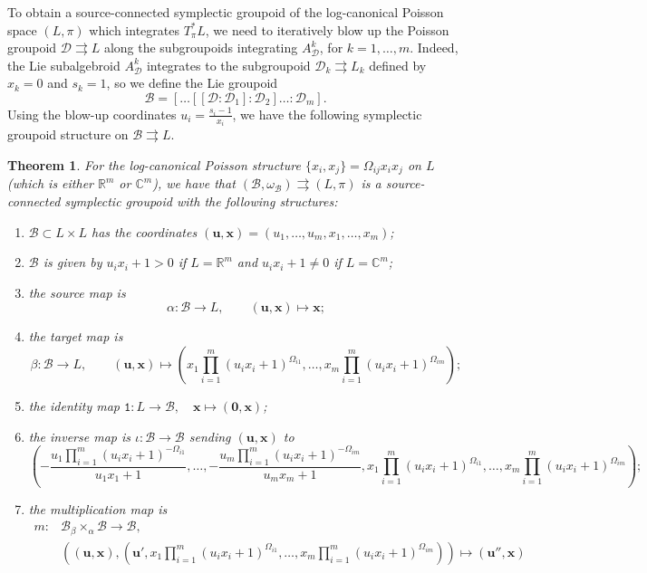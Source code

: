 \documentclass{amsart}
\newtheorem{theorem}{Theorem}[section]
\numberwithin{equation}{section}
\newcommand{\bfu}{{\boldsymbol{u}}}
\newcommand{\bfx}{{\boldsymbol{x}}}
\newcommand{\bfzero}{\mathbf{0}}
\newcommand{\cB}{\mathcal{B}}
\newcommand{\cD}{\mathcal{D}}
\newcommand{\CC}{\mathbb{C}}
\newcommand{\RR}{\mathbb{R}}
\newcommand{\rra}{\rightrightarrows}
\begin{document}
To obtain a source-connected symplectic groupoid of the log-canonical Poisson space $(L, \pi)$ which integrates $T^*_\pi L$, we need to iteratively blow up the Poisson groupoid $\cD \rra L$ along the subgroupoids integrating $A_\cD^k$, for $k =1, \ldots, m$.
Indeed, the Lie subalgebroid $A_\cD^k$ integrates to the subgroupoid $\cD_k \rra L_k$ defined by $x_k=0$ and $s_k=1$, so we define the Lie groupoid
\[\cB = [\ldots[[\cD\!:\!\cD_1]\!:\!\cD_2] \ldots \!:\!\cD_m].\]
Using the blow-up coordinates $u_i = \frac{s_i-1}{x_i}$, we have the following symplectic groupoid structure on $\cB \rra L$.
\begin{theorem} 
  \label{th:blowup groupoid}
  For the log-canonical Poisson structure $\{x_i, x_j\} = \Omega_{ij} x_i x_j$ on $L$ (which is either $\RR^m$ or $\CC^m$), we have that $(\cB, \omega_\cB) \rra (L, \pi)$ is a source-connected symplectic groupoid with the following structures:
  \begin{enumerate}
    \item $\cB \subset L \times L$ has the coordinates $(\bfu, \bfx) = (u_1, \ldots, u_m, x_1, \ldots, x_m)$;
    \item $\cB$ is given by $u_i x_i + 1 > 0$ if $L = \RR^m$ and $u_i x_i + 1\ne 0$ if $L = \CC^m$;
    \item the source map is
      \[\alpha: \cB \to L, \qquad (\bfu, \bfx) \mapsto \bfx;\]
    \item the target map is
      \[\beta: \cB \to L, \qquad (\bfu, \bfx) \mapsto \left(x_1 \prod_{i=1}^m (u_ix_i+1)^{\Omega_{i1}}, \ldots, x_m \prod_{i=1}^m (u_ix_i+1)^{\Omega_{im}}\right);\]
	\item the identity map $\mathtt{1}: L \to \cB, \quad \bfx \mapsto (\bfzero, \bfx)$;
    \item the inverse map is $\iota: \cB \to \cB$ sending $(\bfu, \bfx)$ to 
      \[\left(-\frac{u_1\prod_{i=1}^m (u_ix_i+1)^{-\Omega_{i1}}}{u_1x_1+1}, \ldots, -\frac{u_m\prod_{i=1}^m (u_ix_i+1)^{-\Omega_{im}}}{u_mx_m+1}, x_1 \prod_{i=1}^m (u_ix_i+1)^{\Omega_{i1}}, \ldots, x_m \prod_{i=1}^m (u_ix_i+1)^{\Omega_{im}}\right);\]
    \item the multiplication map is
      \[\begin{aligned}
	  m: & \cB {_\beta \times_\alpha} \cB \to \cB, \\
	     & \left((\bfu, \bfx), \left(\bfu', x_1 \prod_{i=1}^m (u_ix_i+1)^{\Omega_{i1}}, \ldots, x_m \prod_{i=1}^m (u_ix_i+1)^{\Omega_{im}}\right)\right) \mapsto (\bfu'', \bfx )
        \end{aligned}\]

\end{enumerate}
\end{theorem}
\end{document}
